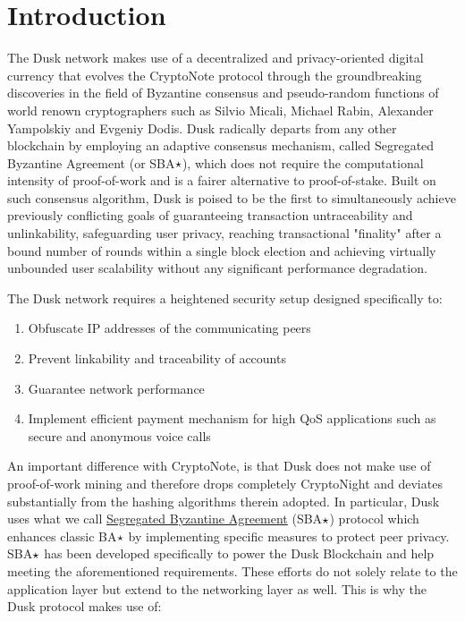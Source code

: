 \section{Introduction}
The \textrm{Dusk} network makes use of a decentralized and privacy-oriented digital currency that evolves the CryptoNote protocol\cite{CryptoNote} through the groundbreaking discoveries in the field of Byzantine consensus and pseudo-random functions of world renown cryptographers such as Silvio Micali, Michael Rabin, Alexander Yampolskiy and Evgeniy Dodis. \textrm{Dusk} radically departs from any other blockchain by employing an adaptive consensus mechanism, called Segregated Byzantine Agreement (or SBA{$\large\star$}), which does not require the computational intensity of proof-of-work and is a fairer alternative to proof-of-stake. Built on such consensus algorithm, \textrm{Dusk} is poised to be the first to simultaneously achieve previously conflicting goals of guaranteeing transaction untraceability and unlinkability, safeguarding user privacy, reaching transactional "finality" after a bound number of rounds within a single block election and achieving virtually unbounded user scalability without any significant performance degradation.

The \textrm{Dusk} network requires a heightened security setup designed specifically to:

\begin{enumerate}
\item Obfuscate IP addresses of the communicating peers
\item Prevent linkability and traceability of accounts
\item Guarantee network performance
\item Implement efficient payment mechanism for high QoS applications such as secure and anonymous voice calls
\end{enumerate}

An important difference with CryptoNote, is that \textrm{Dusk} does not make use of proof-of-work mining and therefore drops completely CryptoNight and deviates substantially from the hashing algorithms therein adopted. In particular, \textrm{Dusk} uses what we call \hyperref[sec:SBA]{Segregated Byzantine Agreement} (SBA$\large\star$) protocol which enhances classic BA$\large\star$ by implementing specific measures to protect peer privacy. SBA$\large\star$ has been developed specifically to power the \textrm{Dusk} Blockchain and help meeting the aforementioned requirements. These efforts do not solely relate to the application layer but extend to the networking layer as well. This is why the \textrm{Dusk} protocol makes use of:

